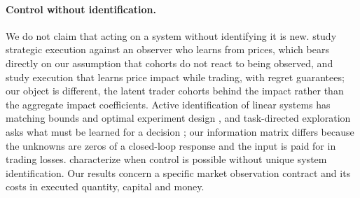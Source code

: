\documentclass[12pt]{article}
\theoremstyle{definition}
\theoremstyle{remark}
\begin{document}
\paragraph{Control without identification.} We do not claim that acting on a system without identifying it is new. \citet{moallemi2008} study strategic execution against an observer who learns from prices, which bears directly on our assumption that cohorts do not react to being observed, and \citet{parkvanroy2015} study execution that learns price impact while trading, with regret guarantees; our object is different, the latent trader cohorts behind the impact rather than the aggregate impact coefficients. Active identification of linear systems has matching bounds and optimal experiment design \citep{wagenmaker2020}, and task-directed exploration asks what must be learned for a decision \citep{wagenmaker2021}; our information matrix differs because the unknowns are zeros of a closed-loop response and the input is paid for in trading losses. \citet{vanwaarde2020} characterize when control is possible without unique system identification. Our results concern a specific market observation contract and its costs in executed quantity, capital and money.
\end{document}
